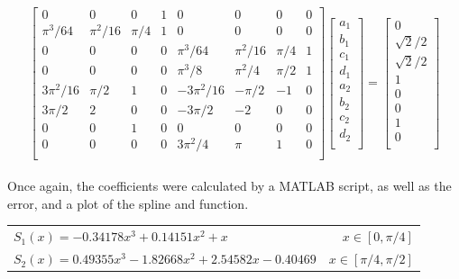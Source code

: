 \documentclass[11pt]{article}
\begin{document}
\begin{enumerate}
\begin{enumerate}[(a)]
				\[
					\begin{bmatrix}
						0 & 0 & 0 & 1 & 0 & 0 & 0 & 0\\
						\pi^3/64 & \pi^2/16 & \pi/4 & 1 & 0 & 0 & 0 & 0\\
						0 & 0 & 0 & 0 & \pi^3/64 & \pi^2/16 & \pi/4 & 1\\
						0 & 0 & 0 & 0 & \pi^3/8 & \pi^2/4 & \pi/2 & 1\\
						3\pi^2/16 & \pi/2 & 1 & 0 & -3\pi^2/16 & -\pi/2 & -1 & 0\\
						3\pi/2 & 2 & 0 & 0 & -3\pi/2 & -2 & 0 & 0\\
						0 & 0 & 1 & 0 & 0 & 0 & 0 & 0\\
						0 & 0 & 0 & 0 & 3\pi^2/4 & \pi & 1 & 0\\
					\end{bmatrix}
					\begin{bmatrix}
						a_1\\
						b_1\\
						c_1\\
						d_1\\
						a_2\\
						b_2\\
						c_2\\
						d_2\\
					\end{bmatrix}
					=
					\begin{bmatrix}
						0\\
						\sqrt{2}/2\\
						\sqrt{2}/2\\
						1\\
						0\\
						0\\
						1\\
						0\\
					\end{bmatrix}
				\] \\

				Once again, the coefficients were calculated by a MATLAB script, as well as the error, and a plot of the
				spline and function. \\

				\begin{center}
				\begin{tabular}{lr}
					$S_1(x) = -0.34178x^3 + 0.14151x^2 + x$ & $x\in[0,\pi/4]$ \\
					$S_2(x) = 0.49355x^3 - 1.82668x^2 + 2.54582x - 0.40469$ & $x\in[\pi/4,\pi/2]$ \\
				\end{tabular}
				\end{center}


\end{enumerate}
\end{enumerate}
\end{document}
